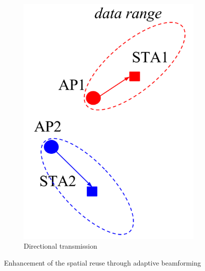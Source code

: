 \documentclass[12pt, a4paper,twoside]{tesi_upf}
\begin{document}
\begin{figure}[t!]
\begin{subfigure}[b]{0.31\textwidth}
					\includegraphics[width=\textwidth]{images/beamforming2}
					\caption{Directional transmission}
					\label{fig:beamforming2}
				\end{subfigure}		
				\caption{Enhancement of the spatial reuse through adaptive beamforming}
				\label{fig:beamforming}
			\end{figure}
						
\end{document}
